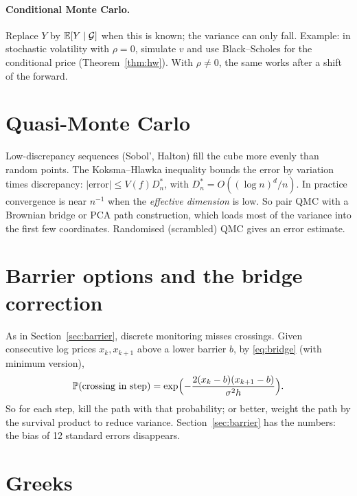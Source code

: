 \paragraph{Conditional Monte Carlo.} Replace $Y$ by $\mathbb{E}[Y\mid\mathcal{G}]$ when this is known; the variance can only fall. Example: in stochastic volatility with $\rho=0$, simulate $v$ and use Black--Scholes for the conditional price (Theorem~\ref{thm:hw}). With $\rho\ne0$, the same works after a shift of the forward.

\section{Quasi-Monte Carlo}

Low-discrepancy sequences (Sobol', Halton) fill the cube more evenly than random points. The Koksma--Hlawka inequality bounds the error by variation times discrepancy: $|\text{error}|\le V(f)D_n^*$, with $D_n^*=O((\log n)^d/n)$. In practice convergence is near $n^{-1}$ when the \emph{effective dimension} is low. So pair QMC with a Brownian bridge or PCA path construction, which loads most of the variance into the first few coordinates. Randomised (scrambled) QMC gives an error estimate.

\section{Barrier options and the bridge correction}\label{sec:mcbarrier}

As in Section~\ref{sec:barrier}, discrete monitoring misses crossings. Given consecutive log prices $x_k,x_{k+1}$ above a lower barrier $b$, by \eqref{eq:bridge} (with minimum version),
\[
\mathbb{P}(\text{crossing in step})=\exp\Bigl(-\frac{2(x_k-b)(x_{k+1}-b)}{\sigma^2h}\Bigr).
\]
So for each step, kill the path with that probability; or better, weight the path by the survival product to reduce variance. Section~\ref{sec:barrier} has the numbers: the bias of 12 standard errors disappears.

\section{Greeks}

